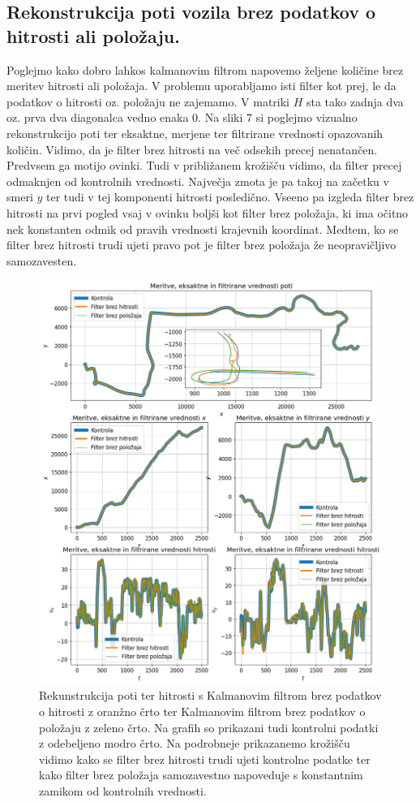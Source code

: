 \documentclass[slovene,11pt,a4paper]{article}
\begin{document}
\subsection{Rekonstrukcija poti vozila brez podatkov o hitrosti ali položaju.}

Poglejmo kako dobro lahkos kalmanovim filtrom napovemo željene količine brez meritev hitrosti ali položaja. V problemu uporabljamo isti filter kot prej, le da podatkov o hitrosti oz. položaju ne zajemamo. V matriki $H$ sta tako zadnja dva oz. prva dva diagonalca vedno enaka 0. Na sliki 7 si poglejmo vizualno rekonstrukcijo poti ter eksaktne, merjene ter filtrirane vrednosti opazovanih količin. Vidimo, da je filter brez hitrosti na več odsekih precej nenatančen. Predvsem ga motijo ovinki. Tudi v približanem krožišču vidimo, da filter precej odmaknjen od kontrolnih vrednosti. Največja zmota je pa takoj na začetku v smeri $y$ ter tudi v tej komponenti hitrosti posledično. Vseeno pa izgleda filter brez hitrosti na prvi pogled vsaj v ovinku boljši kot filter brez položaja, ki ima očitno nek konstanten odmik od pravih vrednosti krajevnih koordinat. Medtem, ko se filter brez hitrosti trudi ujeti pravo pot je filter brez položaja že neopravičljivo samozavesten.

\begin{figure}[h!]
\centering
\includegraphics[width=14cm]{slika7.png}
\caption{Rekunstrukcija poti ter hitrosti s Kalmanovim filtrom brez podatkov o hitrosti z oranžno črto ter Kalmanovim filtrom brez podatkov o položaju z zeleno črto. Na grafih so prikazani tudi kontrolni podatki z odebeljeno modro črto. Na podrobneje prikazanemo krožišču vidimo kako se filter brez hitrosti trudi ujeti kontrolne podatke ter kako filter brez položaja samozavestno napoveduje s konstantnim zamikom od kontrolnih vrednosti.}
\end{figure}
\end{document}

